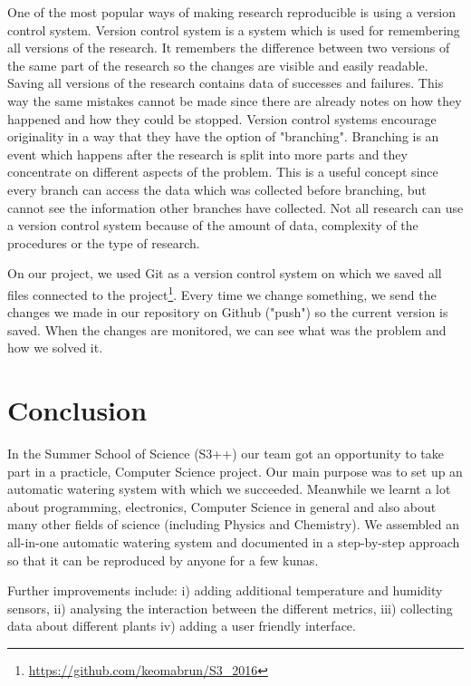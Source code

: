 \documentclass[conference]{IEEEtran}
\begin{document}
One of the most popular ways of making research reproducible is using a version control system.
Version control system is a system which is used for remembering all versions of the research.
It remembers the difference between two versions of the same part of the research so the changes are visible and easily readable.
Saving all versions of the research contains data of successes and failures.
This way the same mistakes cannot be made since there are already notes on how they happened and how they could be stopped.
Version control systems encourage originality in a way that they have the option of "branching".
Branching is an event which happens after the research is split into more parts and they concentrate on different aspects of the problem.
This is a useful concept since every branch can access the data which was collected before branching, but cannot see the information other branches have collected.
Not all research can use a version control system because of the amount of data, complexity of the procedures or the type of research.


On our project, we used Git as a version control system on which we saved all files connected to the project\footnote{\url{https://github.com/keomabrun/S3\_2016}}.
Every time we change something, we send the changes we made in our repository on Github ("push") so the current version is saved.
When the changes are monitored, we can see what was the problem and how we solved it.


\section{Conclusion}
\label{sec:conclusion}


In the Summer School of Science (S3++) our team got an opportunity to take part in a practicle, Computer Science project.
Our main purpose was to set up an automatic watering system with which we succeeded.
Meanwhile we learnt a lot about programming, electronics, Computer Science in general and also about many other fields of science (including Physics and Chemistry).
We assembled an all-in-one automatic watering system and documented in a step-by-step approach so that it can be reproduced by anyone for a few kunas.


Further improvements include:
i) adding additional temperature and humidity sensors,
ii) analysing the interaction between the different metrics,
iii) collecting data about different plants
iv) adding a user friendly interface.
\end{document}
